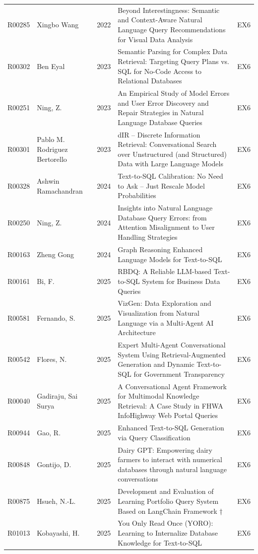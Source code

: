 {\begin{longtable}{@{}l p{3.0cm} l p{11.2cm} l@{}}
R00285 & Xingbo Wang & 2022 & Beyond Interestingness: Semantic and Context-Aware Natural Language Query Recommendations for Visual Data Analysis & EX6 \\
R00302 & Ben Eyal & 2023 & Semantic Parsing for Complex Data Retrieval: Targeting Query Plans vs. SQL for No-Code Access to Relational Databases & EX6 \\
R00251 & Ning, Z. & 2023 & An Empirical Study of Model Errors and User Error Discovery and Repair Strategies in Natural Language Database Queries & EX6 \\
R00301 & Pablo M. Rodriguez Bertorello & 2023 & dIR -- Discrete Information Retrieval: Conversational Search over Unstructured (and Structured) Data with Large Language Models & EX6 \\
R00328 & Ashwin Ramachandran & 2024 & Text-to-SQL Calibration: No Need to Ask -- Just Rescale Model Probabilities & EX6 \\
R00250 & Ning, Z. & 2024 & Insights into Natural Language Database Query Errors: from Attention Misalignment to User Handling Strategies & EX6 \\
R00163 & Zheng Gong & 2024 & Graph Reasoning Enhanced Language Models for Text-to-SQL & EX6 \\
R00161 & Bi, F. & 2025 & RBDQ: A Reliable LLM-based Text-to-SQL System for Business Data Queries & EX6 \\
R00581 & Fernando, S. & 2025 & VizGen: Data Exploration and Visualization from Natural Language via a Multi-Agent AI Architecture & EX6 \\
R00542 & Flores, N. & 2025 & Expert Multi-Agent Conversational System Using Retrieval-Augmented Generation and Dynamic Text-to-SQL for Government Transparency & EX6 \\
R00040 & Gadiraju, Sai Surya & 2025 & A Conversational Agent Framework for Multimodal Knowledge Retrieval: A Case Study in FHWA InfoHighway Web Portal Queries & EX6 \\
R00944 & Gao, R. & 2025 & Enhanced Text-to-SQL Generation via Query Classification & EX6 \\
R00848 & Gontijo, D. & 2025 & Dairy GPT: Empowering dairy farmers to interact with numerical databases through natural language conversations & EX6 \\
R00875 & Hsueh, N.-L. & 2025 & Development and Evaluation of Learning Portfolio Query System Based on LangChain Framework † & EX6 \\
R01013 & Kobayashi, H. & 2025 & You Only Read Once (YORO): Learning to Internalize Database Knowledge for Text-to-SQL & EX6 \\

\end{longtable}}
